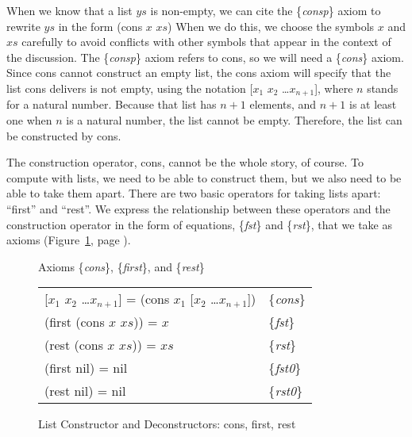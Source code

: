 When we know that a list $ys$ is non-empty,
we can cite the \{\emph{consp}\} axiom
to rewrite $ys$ in the form (cons $x$ $xs$)
When we do this, we choose the symbols $x$ and $xs$ carefully
to avoid conflicts with other symbols that appear in the context of the discussion.
The \{\emph{consp}\} axiom refers to cons, so we will need a \{\emph{cons}\} axiom.
Since cons cannot construct an empty list,
the cons axiom will specify that the list cons delivers is not empty,
using the notation [$x_1$ $x_2$ \dots $x_{n+1}$],
where $n$ stands for a natural number.
Because that list has $n+1$ elements, and $n+1$
is at least one when $n$ is a natural number,
the list cannot be empty.
Therefore, the list can be constructed by cons.

The construction operator, cons, cannot be the whole story, of course.
To compute with lists, we  need to be able to construct them,
but we also need to be able to take them apart.
There are two basic operators for taking lists apart: ``first'' and ``rest''.
We express the relationship between these operators and
the construction operator in the form of equations,
\{\emph{fst}\} and \{\emph{rst}\}, that we take as axioms
(Figure~\ref{first-rest-cons}, page \pageref{first-rest-cons}).

\begin{figure}
\begin{center}
 Axioms \{\emph{cons}\}, \{\emph{first}\}, and \{\emph{rest}\} \\
\begin{tabular}{ll}
 [$x_1$ $x_2$ \dots $x_{n+1}$] = (cons $x_1$ [$x_2$ \dots $x_{n+1}$]) & \{\emph{cons}\} \\
 (first (cons $x$ $xs$)) = $x$                                        & \{\emph{fst}\}\\
 (rest (cons $x$ $xs$))  = $xs$                                       & \{\emph{rst}\} \\
 (first nil) = nil                                                    & \{\emph{fst0}\}\\
 (rest nil) = nil                                                     & \{\emph{rst0}\}
\end{tabular}
\end{center}
\caption{List Constructor and Deconstructors: cons, first, rest}
\label{first-rest-cons}
\end{figure}

